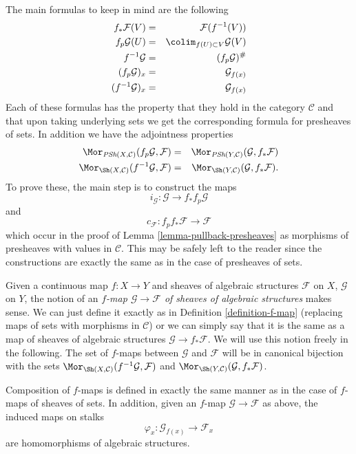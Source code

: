 \medskip\noindent
The main formulas to keep in mind are the following
\begin{eqnarray*}
f_*\mathcal{F}(V) & = & \mathcal{F}(f^{-1}(V)) \\
f_p\mathcal{G}(U) & = & \colim_{f(U) \subset V} \mathcal{G}(V) \\
f^{-1}\mathcal{G} & = & (f_p\mathcal{G})^\# \\
(f_p\mathcal{G})_x & = & \mathcal{G}_{f(x)} \\
(f^{-1}\mathcal{G})_x & = & \mathcal{G}_{f(x)}
\end{eqnarray*}
Each of these formulas has the property that they hold in the
category $\mathcal{C}$ and that upon taking underlying
sets we get the corresponding formula for presheaves of sets.
In addition we have the adjointness properties
\begin{eqnarray*}
\Mor_{\textit{PSh}(X, \mathcal{C})}(f_p\mathcal{G}, \mathcal{F})
& = &
\Mor_{\textit{PSh}(Y, \mathcal{C})}(\mathcal{G}, f_*\mathcal{F}) \\
\Mor_{\Sh(X, \mathcal{C})}(f^{-1}\mathcal{G}, \mathcal{F})
& = &
\Mor_{\Sh(Y, \mathcal{C})}(\mathcal{G}, f_*\mathcal{F}).
\end{eqnarray*}
To prove these, the main step is to construct the maps
$$
i_\mathcal{G} : \mathcal{G} \longrightarrow f_*f_p\mathcal{G}
$$
and
$$
c_\mathcal{F} : f_p f_* \mathcal{F} \longrightarrow \mathcal{F}
$$
which occur in the proof of Lemma \ref{lemma-pullback-presheaves} as
morphisms of presheaves with values in $\mathcal{C}$. This may be safely
left to the reader since the constructions are exactly the same
as in the case of presheaves of sets.

\medskip\noindent
Given a continuous map $f : X \to Y$ and sheaves of algebraic
structures $\mathcal{F}$ on $X$, $\mathcal{G}$ on $Y$, the notion
of an {\it $f$-map $\mathcal{G} \to \mathcal{F}$
of sheaves of algebraic structures} makes sense. We can just define
it exactly as in Definition \ref{definition-f-map} (replacing maps
of sets with morphisms in $\mathcal{C}$) or we can
simply say that it is the same as a map of sheaves of algebraic
structures $\mathcal{G} \to f_*\mathcal{F}$. We will use this
notion freely in the following. The set of $f$-maps between
$\mathcal{G}$ and $\mathcal{F}$ will be in canonical bijection
with the sets
$\Mor_{\Sh(X, \mathcal{C})}(f^{-1}\mathcal{G}, \mathcal{F})$
and
$\Mor_{\Sh(Y, \mathcal{C})}(\mathcal{G}, f_*\mathcal{F})$.

\medskip\noindent
Composition of $f$-maps is defined in exactly the
same manner as in the case of $f$-maps of sheaves of
sets. In addition, given an $f$-map $\mathcal{G} \to \mathcal{F}$
as above, the induced maps on stalks
$$
\varphi_x : \mathcal{G}_{f(x)} \longrightarrow \mathcal{F}_x
$$
are homomorphisms of algebraic structures.


